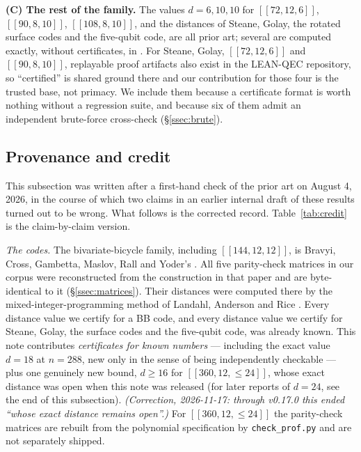 \documentclass[11pt]{amsart}
\newcommand{\gross}{[[144,12,12]]}
\theoremstyle{plain}
\theoremstyle{definition}
\theoremstyle{remark}
\begin{document}
\smallskip
\noindent\textbf{(C) The rest of the family.} The values $d=6,10,10$ for
$[[72,12,6]]$, $[[90,8,10]]$, $[[108,8,10]]$, and the distances of Steane,
Golay, the rotated surface codes and the five-qubit code, are all prior art;
several are computed exactly, without certificates, in \cite{ChenJafariLai}.
For Steane, Golay, $[[72,12,6]]$ and $[[90,8,10]]$, replayable proof artifacts
also exist in the LEAN-QEC repository, so ``certified'' is shared ground
there and our contribution for those four is the trusted base, not primacy.
We include them because a certificate format is worth nothing without a
regression suite, and because six of them admit an independent brute-force
cross-check (\S\ref{ssec:brute}).

\subsection{Provenance and credit}\label{ssec:credit}
This subsection was written after a first-hand check of the prior art on
August 4, 2026, in the course of which two claims in an earlier internal draft
of these results turned out to be wrong. What follows is the corrected record.
Table~\ref{tab:credit} is the claim-by-claim version.

\emph{The codes.} The bivariate-bicycle family, including $\gross$, is Bravyi,
Cross, Gambetta, Maslov, Rall and Yoder's \cite{BCGMRY}. All five parity-check
matrices in our corpus were reconstructed from the construction in that paper
and are byte-identical to it (\S\ref{ssec:matrices}). Their distances were
computed there by the mixed-integer-programming method of Landahl, Anderson
and Rice \cite{LandahlAndersonRice}. Every distance value we certify for a BB
code, and every distance value we certify for Steane, Golay, the surface codes
and the five-qubit code, was already known. This note contributes
\emph{certificates for known numbers} --- including the exact value $d=18$ at
$n=288$, new only in the sense of being independently checkable --- plus one
genuinely new bound, $d\ge16$ for $[[360,12,\le24]]$, whose exact distance
was open when this note was released (for later reports of $d=24$, see the end
of this subsection). \emph{(Correction, 2026-11-17: through v0.17.0 this ended
``whose exact distance remains open''.)} For $[[360,12,\le24]]$ the parity-check matrices are rebuilt from
the polynomial specification by \texttt{check\_prof.py} and are not separately
shipped.
\end{document}
